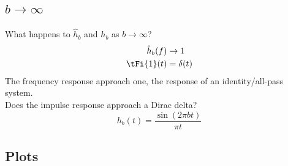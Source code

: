 \documentclass{ximera}
\begin{document}
\subsection{$b \to \infty$}
What happens to $\hat{h}_b$ and $h_b$ as $b \to \infty$?
\begin{align*}
  \hat{h}_b(f) &\to 1\\
  \tFi{1}(t) &=\delta(t)\\
\end{align*}
The frequency response approach one, the response of an identity/all-pass system.\\
Does the impulse response approach a Dirac delta?
\[
   h_b(t) = \frac{\sin(2 \pi b t)}{\pi t}
\]


\subsection{Plots}
\end{document}

